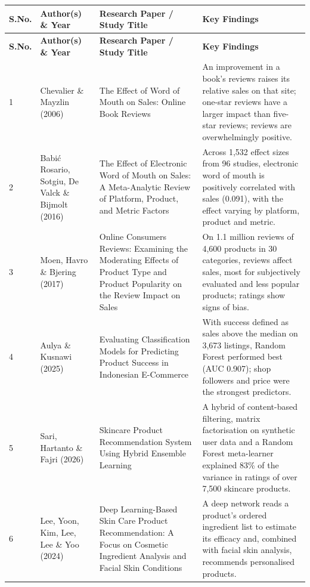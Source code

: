\documentclass[11pt,a4paper]{article}
\newcommand{\draft}[1]{{\color{blue!70!black}#1}}
\begin{document}
\begingroup\color{blue!70!black}\small
\begin{longtable}{|p{0.6cm}|p{3.0cm}|p{5.0cm}|p{6.1cm}|}
\hline
\rowcolor{headfill}\textbf{S.No.} & \textbf{Author(s) \& Year} & \textbf{Research Paper / Study Title} & \textbf{Key Findings} \\
\hline
\endfirsthead
\hline
\rowcolor{headfill}\textbf{S.No.} & \textbf{Author(s) \& Year} & \textbf{Research Paper / Study Title} & \textbf{Key Findings} \\
\hline
\endhead
1 & Chevalier \& Mayzlin (2006) & The Effect of Word of Mouth on Sales: Online Book Reviews & An improvement in a book's reviews raises its relative sales on that site; one-star reviews have a larger impact than five-star reviews; reviews are overwhelmingly positive. \\ \hline
2 & Babi\'{c} Rosario, Sotgiu, De Valck \& Bijmolt (2016) & The Effect of Electronic Word of Mouth on Sales: A Meta-Analytic Review of Platform, Product, and Metric Factors & Across 1,532 effect sizes from 96 studies, electronic word of mouth is positively correlated with sales (0.091), with the effect varying by platform, product and metric. \\ \hline
3 & Moen, Havro \& Bjering (2017) & Online Consumers Reviews: Examining the Moderating Effects of Product Type and Product Popularity on the Review Impact on Sales & On 1.1 million reviews of 4,600 products in 30 categories, reviews affect sales, most for subjectively evaluated and less popular products; ratings show signs of bias. \\ \hline
4 & Aulya \& Kusnawi (2025) & Evaluating Classification Models for Predicting Product Success in Indonesian E-Commerce & With success defined as sales above the median on 3,673 listings, Random Forest performed best (AUC 0.907); shop followers and price were the strongest predictors. \\ \hline
5 & Sari, Hartanto \& Fajri (2026) & Skincare Product Recommendation System Using Hybrid Ensemble Learning & A hybrid of content-based filtering, matrix factorisation on synthetic user data and a Random Forest meta-learner explained 83\% of the variance in ratings of over 7,500 skincare products. \\ \hline
6 & Lee, Yoon, Kim, Lee, Lee \& Yoo (2024) & Deep Learning-Based Skin Care Product Recommendation: A Focus on Cosmetic Ingredient Analysis and Facial Skin Conditions & A deep network reads a product's ordered ingredient list to estimate its efficacy and, combined with facial skin analysis, recommends personalised products. \\ \hline

\end{longtable}
\end{document}
